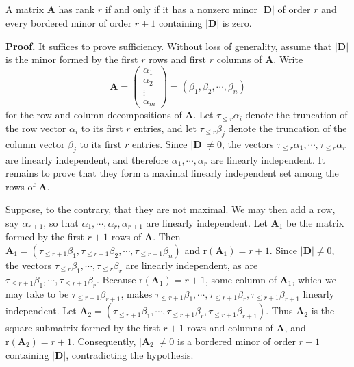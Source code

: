 \documentclass[12pt, a4paper, oneside]{book}
\begin{document}
\subsection{}
\begin{theorem}
    A matrix $\mathbf{A}$ has rank $r$ if and only if it has a nonzero minor $|\mathbf{D}|$ of order $r$ and every bordered minor of order $r+1$ containing $|\mathbf{D}|$ is zero.

    \textbf{Proof.}
    It suffices to prove sufficiency. Without loss of generality, assume that $|\mathbf{D}|$ is the minor formed by the first $r$ rows and first $r$ columns of $\mathbf{A}$. Write
    \begin{equation*}
        \mathbf{A}
        =
        \left(
        \begin{matrix}
                {\alpha}_1 \\
                {\alpha}_2 \\
                \vdots     \\
                {\alpha}_m
            \end{matrix}
        \right)
        =
        \left({\beta}_1, {\beta}_2, \cdots, {\beta}_n\right)
    \end{equation*}
    for the row and column decompositions of $\mathbf{A}$. Let $\tau_{\leq r} {\alpha}_i$ denote the truncation of the row vector ${\alpha}_i$ to its first $r$ entries, and let $\tau_{\leq r} {\beta}_j$ denote the truncation of the column vector ${\beta}_j$ to its first $r$ entries. Since $|\mathbf{D}| \neq 0$, the vectors $\tau_{\leq r} {\alpha}_1, \cdots, \tau_{\leq r} {\alpha}_r$ are linearly independent, and therefore ${\alpha}_1, \cdots, {\alpha}_r$ are linearly independent. It remains to prove that they form a maximal linearly independent set among the rows of $\mathbf{A}$.

    Suppose, to the contrary, that they are not maximal. We may then add a row, say ${\alpha}_{r+1}$, so that ${\alpha}_1, \cdots, {\alpha}_r, {\alpha}_{r+1}$ are linearly independent. Let $\mathbf{A}_1$ be the matrix formed by the first $r+1$ rows of $\mathbf{A}$. Then $\mathbf{A}_1=\left(\tau_{\leq r+1} {\beta}_1, \tau_{\leq r+1} {\beta}_2, \cdots, \tau_{\leq r+1} {\beta}_n\right)$ and $\mathrm{r}\left(\mathbf{A}_1\right)=r+1$. Since $|\mathbf{D}| \neq 0$, the vectors $\tau_{\leq r} {\beta}_1, \cdots, \tau_{\leq r} {\beta}_r$ are linearly independent, as are $\tau_{\leq r+1} {\beta}_1, \cdots, \tau_{\leq r+1} {\beta}_r$. Because $\mathrm{r}\left(\mathbf{A}_1\right)=r+1$, some column of $\mathbf{A}_1$, which we may take to be $\tau_{\leq r+1} {\beta}_{r+1}$, makes $\tau_{\leq r+1} {\beta}_1, \cdots, \tau_{\leq r+1} {\beta}_r, \tau_{\leq r+1} {\beta}_{r+1}$ linearly independent.
    Let $\mathbf{A}_2=\left(\tau_{\leq r+1} {\beta}_1, \cdots, \tau_{\leq r+1} {\beta}_r, \tau_{\leq r+1} {\beta}_{r+1}\right)$. Thus $\mathbf{A}_2$ is the square submatrix formed by the first $r+1$ rows and columns of $\mathbf{A}$, and $\mathrm{r}\left(\mathbf{A}_2\right)=r+1$. Consequently, $\left|\mathbf{A}_2\right| \neq 0$ is a bordered minor of order $r+1$ containing $|\mathbf{D}|$, contradicting the hypothesis.
\end{theorem}
\end{document}
